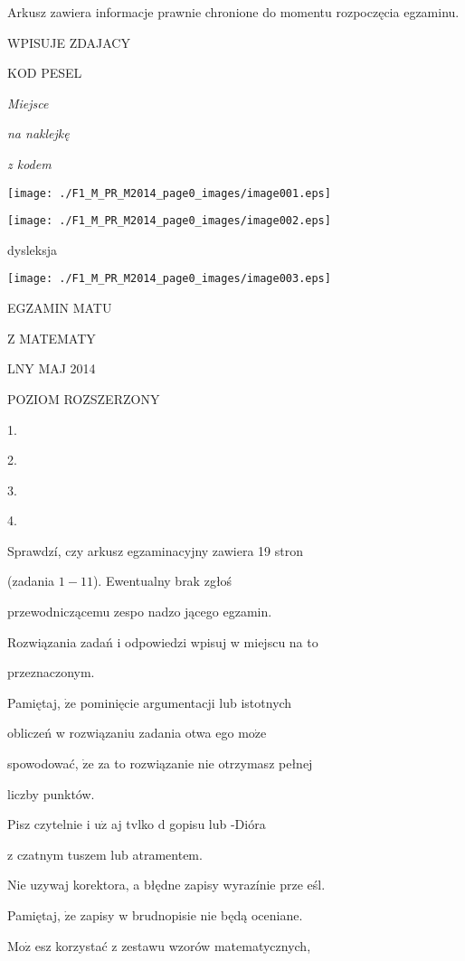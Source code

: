 \documentclass[a4paper,12pt]{article}
\begin{document}
Arkusz zawiera informacje prawnie chronione do momentu rozpoczęcia egzaminu.

WPISUJE ZDAJACY

KOD PESEL

{\it Miejsce}

{\it na naklejkę}

{\it z kodem}
\begin{center}
\texttt{[image: ./F1\_M\_PR\_M2014\_page0\_images/image001.eps]}

\texttt{[image: ./F1\_M\_PR\_M2014\_page0\_images/image002.eps]}
\end{center}
\fbox{} dysleksja
\begin{center}
\texttt{[image: ./F1\_M\_PR\_M2014\_page0\_images/image003.eps]}
\end{center}
EGZAMIN MATU

Z MATEMATY

LNY  MAJ 2014

POZIOM ROZSZERZONY

1.

2.

3.

4.

Sprawdzí, czy arkusz egzaminacyjny zawiera 19 stron

(zadania $1-11$). Ewentualny brak zgłoś

przewodniczącemu zespo nadzo jącego egzamin.

Rozwiązania zadań i odpowiedzi wpisuj w miejscu na to

przeznaczonym.

Pamiętaj, $\dot{\mathrm{z}}\mathrm{e}$ pominięcie argumentacji lub istotnych

obliczeń w rozwiązaniu zadania otwa ego $\mathrm{m}\mathrm{o}\dot{\mathrm{z}}\mathrm{e}$

spowodować, $\dot{\mathrm{z}}\mathrm{e}$ za to rozwiązanie nie otrzymasz pełnej

liczby punktów.

Pisz czytelnie i $\mathrm{u}\dot{\mathrm{z}}$ aj tvlko $\mathrm{d}$ gopisu lub -Dióra

z czatnym tuszem lub atramentem.

Nie uzywaj korektora, a błędne zapisy wyrazínie prze eśl.

Pamiętaj, $\dot{\mathrm{z}}\mathrm{e}$ zapisy w brudnopisie nie będą oceniane.

$\mathrm{M}\mathrm{o}\dot{\mathrm{z}}$ esz korzystać z zestawu wzorów matematycznych,
\end{document}
